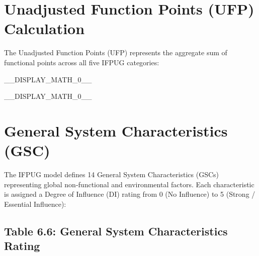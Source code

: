 \section{Unadjusted Function Points (UFP) Calculation}

The Unadjusted Function Points (UFP) represents the aggregate sum of functional points across all five IFPUG categories:

\_\_DISPLAY\_MATH\_0\_\_

\_\_DISPLAY\_MATH\_0\_\_

\section{General System Characteristics (GSC)}

The IFPUG model defines 14 General System Characteristics (GSCs) representing global non-functional and environmental factors. Each characteristic is assigned a Degree of Influence (DI) rating from 0 (No Influence) to 5 (Strong / Essential Influence):

\subsection{Table 6.6: General System Characteristics Rating}


